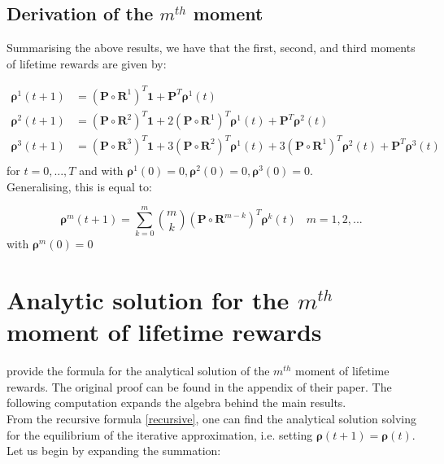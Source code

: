 \documentclass[\main/main.tex]{subfiles}
\begin{document}
\subsection{Derivation of the $m^{th}$ moment}

Summarising the above results, we have that the first, second, and third moments of lifetime rewards are given by:

\begin{equation}
    \begin{split}
     \bm{\rho}^1(t+1) &= (\mathbf{P} \circ \mathbf{R}^1) ^T\mathbf{1} + \mathbf{P}^T \bm{\rho}^1(t) \\
      \bm{\rho}^2(t+1) &= (\mathbf{P} \circ \mathbf{R}^2) ^ T\mathbf{1} + 2 (\mathbf{P} \circ \mathbf{R}^1) ^T \bm{\rho}^1(t) + 
      \mathbf{P}^T \bm{\rho}^2(t) \\
     \bm{\rho}^3(t+1) &= (\mathbf{P} \circ \mathbf{R}^3) ^ T\mathbf{1} + 3 (\mathbf{P} \circ \mathbf{R}^2) ^T \bm{\rho}^1(t) + 3 (\mathbf{P} \circ \mathbf{R}^1) ^T \bm{\rho}^2(t) + \mathbf{P}^T \bm{\rho}^3(t) \\
\end{split}
\end{equation}for $t=0, ... ,T$ and with $\bm{\rho}^1(0) = 0, \bm{\rho}^2(0) = 0,\bm{\rho}^3(0) = 0$.\\
Generalising, this is equal to:

\begin{equation}\label{recursive}
    \bm{\rho}^m(t+1) = \sum_{k=0}^{m} {m \choose k} (\mathbf{P} \circ \mathbf{R}^{m-k}) ^ T \bm{\rho}^k(t) \;\; \; m=1,2,...
\end{equation}
with $\bm{\rho}^m(0)=0$ 


\section{Analytic solution for the $m^{th}$ moment of lifetime rewards}\label{sec:analytical_solution}
\cite{VanDaalen2017} provide the formula for the analytical solution of the $m^{th}$ moment of lifetime rewards. The original proof can be found in the appendix of their paper. The following computation expands the algebra behind the main results.\\

From the recursive formula \ref{recursive}, one can find the analytical solution solving for the equilibrium of the iterative approximation, i.e. setting $\bm{\rho}(t+1) = \bm{\rho}(t)$. Let us begin by expanding the summation:
\end{document}

